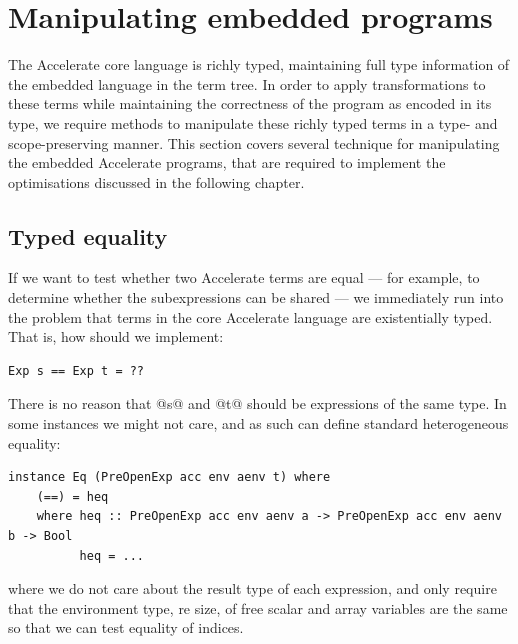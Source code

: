 \section{Manipulating embedded programs}
\label{sec:manipulating_embedded_programs}

The Accelerate core language is richly typed, maintaining full type information
of the embedded language in the term tree. In order to apply transformations to
these terms while maintaining the correctness of the program as encoded in its
type, we require methods to manipulate these richly typed terms in a type- and
scope-preserving manner. This section covers several technique for manipulating
the embedded Accelerate programs, that are required to implement the
optimisations discussed in the following chapter.


\subsection{Typed equality}
\label{sec:equality}

If we want to test whether two Accelerate terms are equal --- for example, to
determine whether the subexpressions can be shared --- we immediately run into
the problem that terms in the core Accelerate language are existentially typed.
That is, how should we implement:
%
\begin{lstlisting}[style=haskell]
Exp s == Exp t = ??
\end{lstlisting}
%
There is no reason that @s@ and @t@ should be expressions of the same
type. In some instances we might not care, and as such can define standard
heterogeneous equality:
%
\begin{lstlisting}[style=haskell]
instance Eq (PreOpenExp acc env aenv t) where
    (==) = heq
    where heq :: PreOpenExp acc env aenv a -> PreOpenExp acc env aenv b -> Bool
          heq = ...
\end{lstlisting}
%
where we do not care about the result type of each expression, and only require
that the environment type, re size, of free scalar and array variables are the
same so that we can test equality of  indices.

